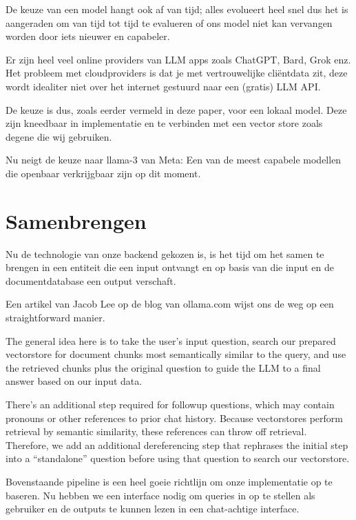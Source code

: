 De keuze van een model hangt ook af van tijd; alles evolueert heel snel dus het is aangeraden om van tijd tot tijd te evalueren of ons model niet kan vervangen worden door iets nieuwer en capabeler.

Er zijn heel veel online providers van LLM apps zoals ChatGPT, Bard, Grok enz. 
Het probleem met cloudproviders is dat je met vertrouwelijke cliëntdata zit, deze wordt idealiter niet over het internet gestuurd naar een (gratis) LLM API. 

De keuze is dus, zoals eerder vermeld in deze paper, voor een lokaal model.
Deze zijn kneedbaar in implementatie en te verbinden met een vector store zoals degene die wij gebruiken. 


Nu neigt de keuze naar llama-3 van Meta: Een van de meest capabele modellen die openbaar verkrijgbaar zijn op dit moment.
\newpage
\section{Samenbrengen}
Nu de technologie van onze backend gekozen is, is het tijd om het samen te brengen in een entiteit die een input ontvangt en op basis van die input en de documentdatabase een output verschaft.

Een artikel van Jacob Lee op de blog van ollama.com wijst ons de weg op een straightforward manier.

\begin{displayquote}
	The general idea here is to take the user’s input question, search our prepared vectorstore for document chunks most semantically similar to the query,
	and use the retrieved chunks plus the original question to guide the LLM to a final answer based on our input data.

	There’s an additional step required for followup questions, which may contain pronouns or other references to prior chat history.
	Because vectorstores perform retrieval by semantic similarity, these references can throw off retrieval.
	Therefore, we add an additional dereferencing step that rephrases the initial step into a “standalone” question before using that question to search our vectorstore. \autocite{Ollama}
	\begin{figure}[h]
	\end{figure}
\end{displayquote}

Bovenstaande pipeline is een heel goeie richtlijn om onze implementatie op te baseren. Nu hebben we een interface nodig om queries in op te stellen als gebruiker en de outputs te kunnen lezen in een chat-achtige interface. 

